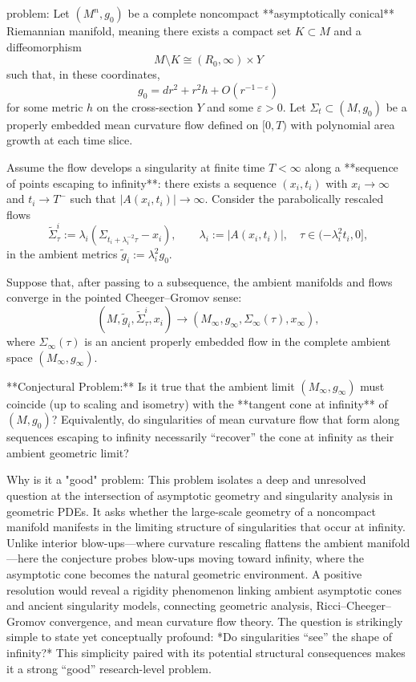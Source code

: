problem:  
Let \((M^n,g_0)\) be a complete noncompact **asymptotically conical** Riemannian manifold, meaning there exists a compact set \(K \subset M\) and a diffeomorphism  
\[
M \setminus K \cong (R_0,\infty) \times Y
\]
such that, in these coordinates,  
\[
g_0 = dr^2 + r^2 h + O(r^{-1-\varepsilon})
\]
for some metric \(h\) on the cross-section \(Y\) and some \(\varepsilon>0\).  
Let \(\Sigma_t \subset (M,g_0)\) be a properly embedded mean curvature flow defined on \([0,T)\) with polynomial area growth at each time slice.  

Assume the flow develops a singularity at finite time \(T<\infty\) along a **sequence of points escaping to infinity**: there exists a sequence \((x_i,t_i)\) with \(x_i \to \infty\) and \(t_i \to T^-\) such that \(|A(x_i,t_i)| \to \infty\).  
Consider the parabolically rescaled flows
\[
\tilde{\Sigma}^i_\tau := \lambda_i(\Sigma_{t_i + \lambda_i^{-2}\tau} - x_i), \qquad \lambda_i := |A(x_i,t_i)|, \quad \tau \in (-\lambda_i^2 t_i, 0],
\]
in the ambient metrics \(\tilde g_i := \lambda_i^2 g_0\).

Suppose that, after passing to a subsequence, the ambient manifolds and flows converge in the pointed Cheeger–Gromov sense:
\[
(M,\tilde g_i, \tilde{\Sigma}^i_\tau, x_i) \longrightarrow (M_\infty, g_\infty, \Sigma_\infty(\tau), x_\infty),
\]
where \(\Sigma_\infty(\tau)\) is an ancient properly embedded flow in the complete ambient space \((M_\infty,g_\infty)\).

**Conjectural Problem:**  
Is it true that the ambient limit \((M_\infty,g_\infty)\) must coincide (up to scaling and isometry) with the **tangent cone at infinity** of \((M,g_0)\)?  
Equivalently, do singularities of mean curvature flow that form along sequences escaping to infinity necessarily “recover” the cone at infinity as their ambient geometric limit?

Why is it a "good" problem:  
This problem isolates a deep and unresolved question at the intersection of asymptotic geometry and singularity analysis in geometric PDEs. It asks whether the large-scale geometry of a noncompact manifold manifests in the limiting structure of singularities that occur at infinity. Unlike interior blow-ups—where curvature rescaling flattens the ambient manifold—here the conjecture probes blow-ups moving toward infinity, where the asymptotic cone becomes the natural geometric environment. A positive resolution would reveal a rigidity phenomenon linking ambient asymptotic cones and ancient singularity models, connecting geometric analysis, Ricci–Cheeger–Gromov convergence, and mean curvature flow theory. The question is strikingly simple to state yet conceptually profound: *Do singularities “see” the shape of infinity?* This simplicity paired with its potential structural consequences makes it a strong “good” research-level problem.